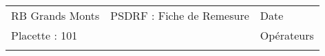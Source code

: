 \documentclass[a4paper, landscape]{article}\usepackage[]{graphicx}\usepackage[]{color}
\begin{document}



\renewcommand{\arraystretch}{1.4} %
\setlength{\tabcolsep}{1pt} %




\begin{tabular}{p{10cm}p{10cm}p{8cm}}
  RB Grands Monts & PSDRF : Fiche de Remesure & Date \\ 
  Placette : 101 &  & Opérateurs \\ 
   &  &  \\ 
  \end{tabular}
\end{document}
